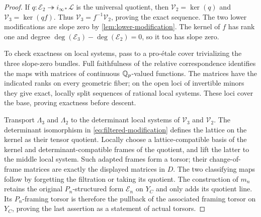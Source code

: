 \begin{proof}
If $q:\mathcal E_2\twoheadrightarrow i_{\infty *}\mathcal L$
is the universal quotient, then
$\mathcal V_2=\ker(q)$ and $\mathcal V_3=\ker(qf)$.
Thus $\mathcal V_3=f^{-1}\mathcal V_2$, proving the exact sequence.
The two lower modifications are slope zero by
\cref{lem:lower-modification}.  The kernel of $f$ has rank one and
degree $\deg(\mathcal E_3)-\deg(\mathcal E_2)=0$, so it too has slope
zero.

To check exactness on local systems, pass to a pro-\'etale cover
trivializing the three slope-zero bundles.  Full faithfulness of the
relative correspondence identifies the maps with matrices of
continuous $\mathbb Q_p$-valued functions.  The matrices have the indicated
ranks on every geometric fiber; on the open loci of invertible minors
they give exact, locally split sequences of rational local systems.
These loci cover the base, proving exactness before descent.

Transport $\Lambda_3$ and $\Lambda_2$ to the determinant local systems
of $\mathcal V_3$ and $\mathcal V_2$.  The determinant isomorphism in
\cref{eq:filtered-modification} defines the lattice on the kernel as
their tensor quotient.  Locally choose a lattice-compatible basis of
the kernel and determinant-compatible frames of the quotient, and
lift the latter to the middle local system.  Such adapted frames form
a torsor; their change-of-frame matrices are exactly the displayed
matrices in $D$.  The two classifying maps follow by forgetting the
filtration or taking its quotient.  The construction of $m_n$ retains
the original $P_n$-structured form $\mathcal E_n$ on $Y_C$ and only
adds its quotient line.  Its $P_n$-framing torsor is therefore the
pullback of the associated framing torsor on $Y_C$, proving the last
assertion as a statement of actual torsors.
\end{proof}
